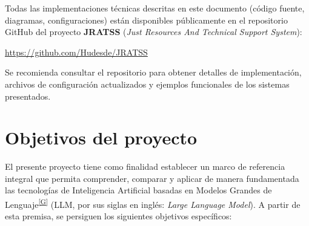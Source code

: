 \documentclass[12pt,a4paper]{report}
\numberwithin{figure}{section}
\begin{document}
\vspace{0.5cm}

\begin{tcolorbox}[colback=blue!5!white, colframe=blue!75!black, title=\textbf{Nota importante sobre recursos y material de consulta}]
Todas las implementaciones técnicas descritas en este documento (código fuente, diagramas, configuraciones) están disponibles públicamente en el repositorio GitHub del proyecto \textbf{JRATSS} (\textit{Just Resources And Technical Support System}):

\centering
\url{https://github.com/Hudesde/JRATSS}

\raggedright
\vspace{0.2cm}
Se recomienda consultar el repositorio para obtener detalles de implementación, archivos de configuración actualizados y ejemplos funcionales de los sistemas presentados.
\end{tcolorbox}

\vspace{0.5cm}

\section{Objetivos del proyecto}
\label{sec:objetivos}

El presente proyecto tiene como finalidad establecer un marco de referencia integral que permita comprender, comparar y aplicar de manera fundamentada las tecnologías de Inteligencia Artificial basadas en Modelos Grandes de Lenguaje\textsuperscript{\hyperref[glos:llm]{[G]}} (LLM, por sus siglas en inglés: \textit{Large Language Model}). A partir de esta premisa, se persiguen los siguientes objetivos específicos:
\end{document}
